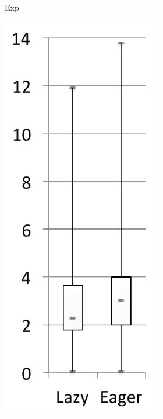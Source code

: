 \documentclass[sigplan,10pt,screen]{acmart}\settopmatter{printfolios=true,printccs=true,printacmref=true}
\begin{document}
\begin{figure}[bth]
\begin{subfigure}[b]{.48\textwidth}
\begin{subfigure}[b]{.24\textwidth}
		\caption{Exp}
   	\end{subfigure}	
	\begin{subfigure}[b]{.24\textwidth}
		\includegraphics[width=\linewidth]{figures/netBeansExpCache} 

\end{subfigure}
\end{subfigure}
\end{figure}
\end{document}
